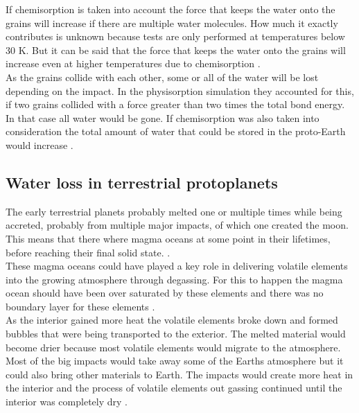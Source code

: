 \newpage
If chemisorption is taken into account the force that keeps the water onto the grains will increase if there are multiple water molecules. How much it exactly contributes is unknown because tests are only performed at temperatures below 30 K. But it can be said that the force that keeps the water onto the grains will increase even at higher temperatures due to chemisorption \cite{TPchemistry}. \\

As the grains collide with each other, some or all of the water will be lost depending on the impact. In the physisorption simulation they accounted for this, if two grains collided with a force greater than two times the total bond energy. In that case all water would be gone. If chemisorption was also taken into consideration the total amount of water that could be stored in the proto-Earth would increase \cite{TPStimpf1} \cite{TPStimpf2}.


\subsection{Water loss in terrestrial protoplanets}
The early terrestrial planets probably melted one or multiple times while being accreted, probably from multiple major impacts, of which one created the moon. This means that there where magma oceans at some point in their lifetimes, before reaching their final solid state.  \cite{TPformationPlanetesimals}. \\

These magma oceans could have played a key role in delivering volatile elements into the growing atmosphere through degassing. For this to happen the magma ocean should have been over saturated by these elements and there was no boundary layer for these elements \cite[p.~128-129]{TPmagma}. \\

As the interior gained more heat the volatile elements broke down and formed bubbles that were being transported to the exterior. The melted material would become drier because most volatile elements would migrate to the atmosphere. Most of the big impacts would take away some of the Earths atmosphere but it could also bring other materials to Earth. The impacts would create more heat in the interior and the process of volatile elements out gassing continued until the interior was completely dry \cite[p.~130-131]{TPmagma}.\\

